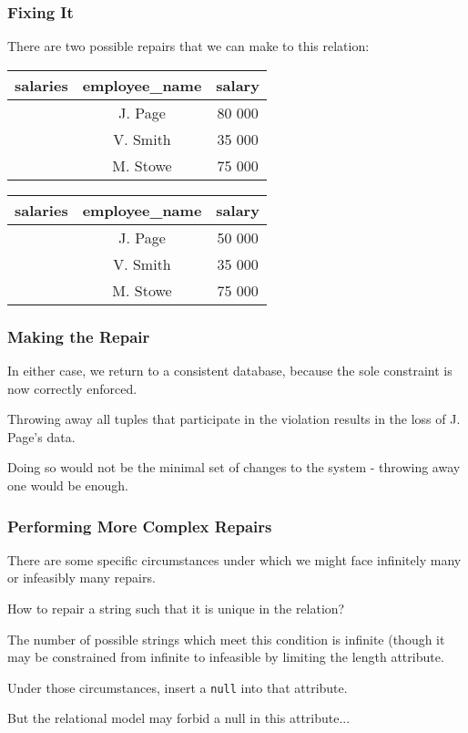 \begin{frame}
\frametitle{Fixing It}

There are two possible repairs that we can make to this relation:

\begin{table}[h]\begin{center}
        \begin{tabular}{r | c  c} 
					salaries & employee\_name & salary \\ \hline
	         		 & J. Page  & 80 000 \\ 
					 & V. Smith & 35 000 \\ 
					 & M. Stowe & 75 000 \\ 
        \end{tabular}
\end{center}\end{table}

\begin{table}[h]\begin{center}
        \begin{tabular}{r | c  c} 
					salaries & employee\_name & salary \\ \hline
	           		 & J. Page  & 50 000 \\ 
					 & V. Smith & 35 000 \\ 
					 & M. Stowe & 75 000 \\ 
        \end{tabular}
\end{center}\end{table}

\end{frame}


\begin{frame}
\frametitle{Making the Repair}

In either case, we return to a consistent database, because the sole constraint is now correctly enforced.

Throwing away all tuples that participate in the violation results in the loss of J. Page's data. 

Doing so would not be the minimal set of changes to the system - throwing away one would be enough.

\end{frame}


\begin{frame}
\frametitle{Performing More Complex Repairs}

There are some specific circumstances under which we might face infinitely many or infeasibly many repairs. 

How to repair a string such that it is unique in the relation? 

The number of possible strings which meet this condition is infinite (though it may be constrained from infinite to infeasible by limiting the length attribute. 

Under those circumstances, insert a \texttt{null} into that attribute.

But the relational model may forbid a null in this attribute...


\end{frame}



